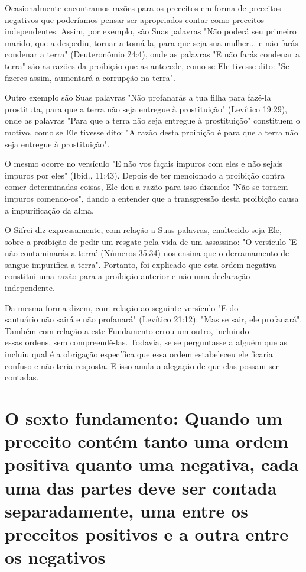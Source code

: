 \begin{itemize}
\begin{enumrate}
Ocasionalmente encontramos razões para os preceitos em forma de
preceitos negativos que poderíamos pensar ser apropriados contar como
pre­ceitos independentes. Assim, por exemplo, são Suas palavras "Não
poderá seu primeiro marido, que a despediu, tornar a tomá-la, para que
seja sua mulher... e não farás condenar a terra" (Deuteronômio 24:4),
onde as palavras "E não farás condenar a terra" são as razões da
proibição que as antecede, como se Ele tivesse dito: "Se fizeres assim,
aumentará a corrupção na terra".

Outro exemplo são Suas palavras "Não profanarás a tua filha para fazê-la
prostituta, para que a terra não seja entregue à prostituição" (Levítico
19:29), onde as palavras "Para que a terra não seja entregue à
prostituição" cons­tituem o motivo, como se Ele tivesse dito: "A razão
desta proibição é para que a terra não seja entregue à prostituição".

O mesmo ocorre no versículo "E não vos façais impuros com eles e não
sejais impuros por eles" (Ibid., 11:43). Depois de ter mencionado a
proibição contra comer determinadas coisas, Ele deu a razão para isso
dizendo: "Não se tornem impuros comendo-os", dando a entender que a
transgressão desta proibição causa a impurificação da alma.

O Sifrei diz expressamente, com relação a Suas palavras, enaltecido seja
Ele, sobre a proibição de pedir um resgate pela vida de um assassino: "O
versículo 'E não contaminarás a terra' (Números 35:34) nos ensina que o
derra­mamento de sangue impurifica a terra". Portanto, foi explicado que
esta or­dem negativa constitui uma razão para a proibição anterior e não
uma declara­ção independente.


Da mesma forma dizem, com relação ao seguinte versículo "E do\\
santuário não sairá e não profanará" (Levítico 21:12): "Mas se sair, ele
profanará".\\
Também com relação a este Fundamento errou um outro, incluindo\\
essas ordens, sem compreendê-las. Todavia, se se perguntasse a alguém
que as\\
incluiu qual é a obrigação específica que essa ordem estabeleceu ele
ficaria confuso
e não teria resposta. E isso anula a alegação de que elas possam
ser contadas.



\chapter{O sexto fundamento: Quando um preceito 
contém tanto uma ordem positiva quanto uma negativa,
cada uma das partes deve ser contada separadamente, uma entre os
preceitos positivos e a outra entre os negativos}


\end{enumrate}
\end{itemize}

